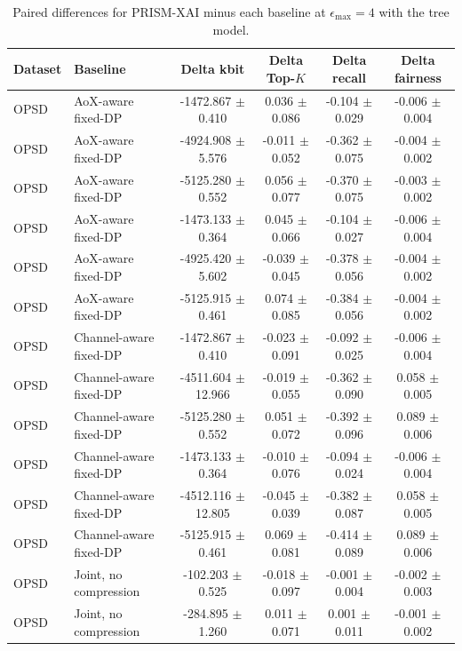 \begin{table}[t]
\caption{Paired differences for PRISM-XAI minus each baseline at $\epsilon_{\max}=4$ with the tree model.}
\label{tab:paired-differences}
\centering
\scriptsize
\setlength{\tabcolsep}{3pt}
\begin{tabular}{llcccc}
\toprule
Dataset & Baseline & Delta kbit & Delta Top-$K$ & Delta recall & Delta fairness \\
\midrule
OPSD & AoX-aware fixed-DP & -1472.867 $\pm$ 0.410 & 0.036 $\pm$ 0.086 & -0.104 $\pm$ 0.029 & -0.006 $\pm$ 0.004 \\
OPSD & AoX-aware fixed-DP & -4924.908 $\pm$ 5.576 & -0.011 $\pm$ 0.052 & -0.362 $\pm$ 0.075 & -0.004 $\pm$ 0.002 \\
OPSD & AoX-aware fixed-DP & -5125.280 $\pm$ 0.552 & 0.056 $\pm$ 0.077 & -0.370 $\pm$ 0.075 & -0.003 $\pm$ 0.002 \\
OPSD & AoX-aware fixed-DP & -1473.133 $\pm$ 0.364 & 0.045 $\pm$ 0.066 & -0.104 $\pm$ 0.027 & -0.006 $\pm$ 0.004 \\
OPSD & AoX-aware fixed-DP & -4925.420 $\pm$ 5.602 & -0.039 $\pm$ 0.045 & -0.378 $\pm$ 0.056 & -0.004 $\pm$ 0.002 \\
OPSD & AoX-aware fixed-DP & -5125.915 $\pm$ 0.461 & 0.074 $\pm$ 0.085 & -0.384 $\pm$ 0.056 & -0.004 $\pm$ 0.002 \\
OPSD & Channel-aware fixed-DP & -1472.867 $\pm$ 0.410 & -0.023 $\pm$ 0.091 & -0.092 $\pm$ 0.025 & -0.006 $\pm$ 0.004 \\
OPSD & Channel-aware fixed-DP & -4511.604 $\pm$ 12.966 & -0.019 $\pm$ 0.055 & -0.362 $\pm$ 0.090 & 0.058 $\pm$ 0.005 \\
OPSD & Channel-aware fixed-DP & -5125.280 $\pm$ 0.552 & 0.051 $\pm$ 0.072 & -0.392 $\pm$ 0.096 & 0.089 $\pm$ 0.006 \\
OPSD & Channel-aware fixed-DP & -1473.133 $\pm$ 0.364 & -0.010 $\pm$ 0.076 & -0.094 $\pm$ 0.024 & -0.006 $\pm$ 0.004 \\
OPSD & Channel-aware fixed-DP & -4512.116 $\pm$ 12.805 & -0.045 $\pm$ 0.039 & -0.382 $\pm$ 0.087 & 0.058 $\pm$ 0.005 \\
OPSD & Channel-aware fixed-DP & -5125.915 $\pm$ 0.461 & 0.069 $\pm$ 0.081 & -0.414 $\pm$ 0.089 & 0.089 $\pm$ 0.006 \\
OPSD & Joint, no compression & -102.203 $\pm$ 0.525 & -0.018 $\pm$ 0.097 & -0.001 $\pm$ 0.004 & -0.002 $\pm$ 0.003 \\
OPSD & Joint, no compression & -284.895 $\pm$ 1.260 & 0.011 $\pm$ 0.071 & 0.001 $\pm$ 0.011 & -0.001 $\pm$ 0.002 \\

\end{tabular}
\end{table}
